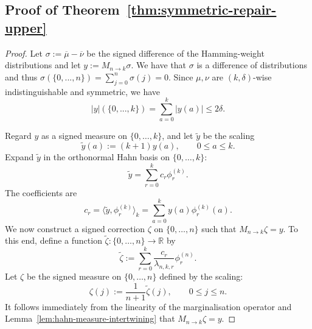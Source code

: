 \documentclass[manuscript,nonacm]{acmart}
\begin{document}
\subsection{Proof of Theorem~\ref{thm:symmetric-repair-upper}}
\label{subsec:symmetric-approx-to-exact}    
\begin{proof}
Let $\sigma:=\overline{\mu}-\overline{\nu}$
be the signed difference of the Hamming-weight distributions and let $y:=M_{n\to k}\sigma$. We have that $\sigma$ is a difference of distributions and thus $\sigma(\{0,...,n\})=\sum_{j=0}^n \sigma(j)=0$. Since \(\mu,\nu\) are \((k,\delta)\)-wise indistinguishable and symmetric,
we have
\[
    |y|(\{0,...,k\})=\sum_{a=0}^k|y(a)|\le 2\delta.
\]

Regard \(y\) as a signed measure on \(\{0,\dots,k\}\), and let \(\widetilde{y}\) be the scaling 
\[
    \widetilde{y}(a):=(k+1)y(a),
    \qquad 0\le a\le k.
\]
Expand \(\widetilde{y}\) in the orthonormal Hahn basis on \(\{0,\dots,k\}\):
\[
    \widetilde{y}=\sum_{r=0}^k c_r\phi_r^{(k)}.
\]
The coefficients are
\[
    c_r
    =
    \langle \widetilde{y},\phi_r^{(k)}\rangle_k
    =
    \sum_{a=0}^k y(a)\phi_r^{(k)}(a).
\]
We now construct a signed correction \(\zeta\) on \(\{0,\dots,n\}\) such
that $M_{n\to k}\zeta=y$. To this end, define a function \(\widetilde{\zeta}:\{0,\dots,n\}\to\mathbb R\) by
\[
    \widetilde{\zeta}
    :=
    \sum_{r=0}^k
    \frac{c_r}{\lambda_{n,k,r}}\phi_r^{(n)}.
\]
Let \(\zeta\) be the signed measure on \(\{0,\dots,n\}\) defined by the scaling:
\[
    \zeta(j):=\frac{1}{n+1}\widetilde{\zeta}(j),
    \qquad 0\le j\le n.
\]
It follows immediately from the linearity of the marginalisation operator and Lemma~\ref{lem:hahn-measure-intertwining} that $M_{n\to k}\zeta=y$.


\end{proof}
\end{document}
